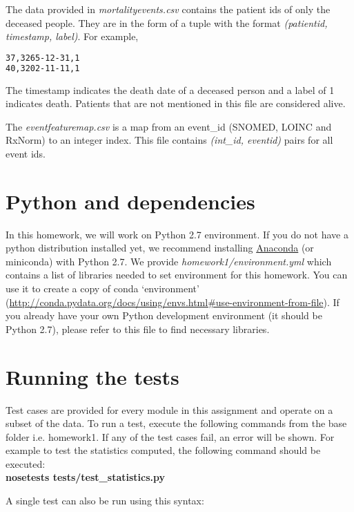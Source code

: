 \documentclass[12pt]{article}
\begin{document}
The data provided in \textit{mortality\textunderscore events.csv} contains the patient ids of only the deceased people. They are in the form of a tuple with the format \textit{(patient\textunderscore id, timestamp, label)}. For example,
\begin{lstlisting}[frame=single, language=bash]
37,3265-12-31,1
40,3202-11-11,1
\end{lstlisting}

The timestamp indicates the death date of a deceased person and a label of 1 indicates death. Patients that are not mentioned in this file are considered alive.

The \textit{event\textunderscore feature\textunderscore map.csv} is a map from an event\_id (SNOMED, LOINC and RxNorm) to an integer index. This file contains \textit{(int\_id, event\textunderscore id)} pairs for all event ids.

\section*{Python and dependencies}
In this homework, we will work on Python 2.7 environment. If you do not have a python distribution installed yet, we recommend installing \href{https://docs.continuum.io/anaconda/install}{Anaconda} (or miniconda) with Python 2.7. We provide \textit{homework1/environment.yml} which contains a list of libraries needed to set environment
for this homework. You can use it to create a copy of conda `environment' (\href{http://conda.pydata.org/docs/using/envs.html#use-environment-from-file}{http://conda.pydata.org/docs/using/envs.html\#use-environment-from-file}). If you already have your own Python development environment (it should be Python 2.7), please refer to this file to find necessary libraries.

\section*{Running the tests}
Test cases are provided for every module in this assignment and operate on a subset of the data. To run a test, execute the following commands from the base folder i.e. homework1. If any of the test cases fail, an error will be shown. For example to test the statistics computed, the following command should be executed: \\

\textbf{nosetests tests/test\_statistics.py}
\newline

\noindent A single test can also be run using this syntax: \\
    
\end{document}
